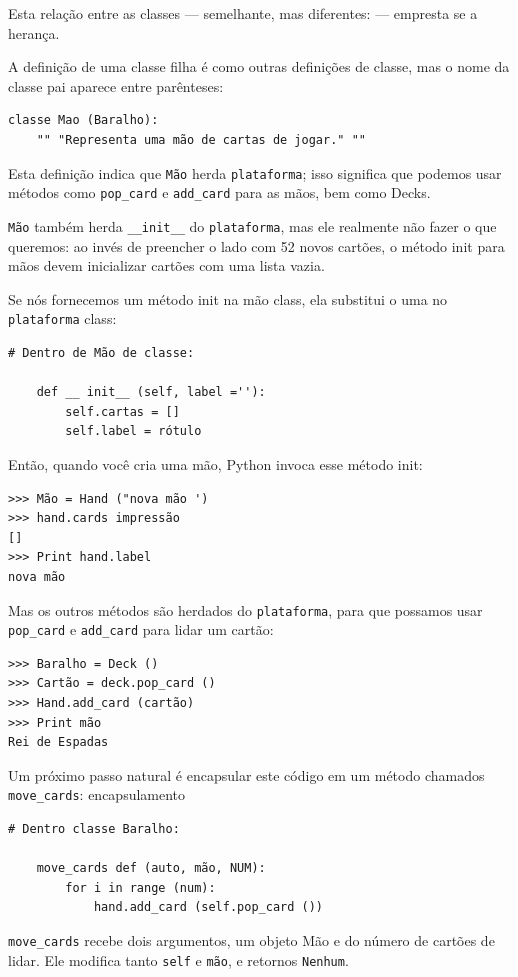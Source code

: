 \documentclass[10pt]{book}
\begin{document}
\begin{exercise}
\begin{v erbatim}
Esta relação entre as classes --- semelhante, mas diferentes: --- empresta
se a herança.  

A definição de uma classe filha é como outras definições de classe,
mas o nome da classe pai aparece entre parênteses:

\begin{verbatim}
classe Mao (Baralho):
    "" "Representa uma mão de cartas de jogar." ""
\end{verbatim}
%
Esta definição indica que {\tt Mão} herda {\tt plataforma};
isso significa que podemos usar métodos como \verb "pop_card" e \verb "add_card"
para as mãos, bem como Decks.

{\tt Mão} também herda \verb "__init__" do {\tt plataforma}, mas
ele realmente não fazer o que queremos: ao invés de preencher o lado
com 52 novos cartões, o método init para mãos devem inicializar
{cartões \tt} com uma lista vazia.

Se nós fornecemos um método init na mão {\tt} class, ela substitui o
uma no {\tt plataforma} class:

\begin{verbatim}
# Dentro de Mão de classe:

    def __ init__ (self, label =''):
        self.cartas = []
        self.label = rótulo
\end{verbatim}
%
Então, quando você cria uma mão, Python invoca esse método init:

\begin{verbatim}
>>> Mão = Hand ("nova mão ')
>>> hand.cards impressão
[]
>>> Print hand.label
nova mão
\end{verbatim}
%
Mas os outros métodos são herdados do {\tt plataforma}, para que possamos usar
\Verb "pop_card" e \verb "add_card" para lidar um cartão:

\begin{verbatim}
>>> Baralho = Deck ()
>>> Cartão = deck.pop_card ()
>>> Hand.add_card (cartão)
>>> Print mão
Rei de Espadas
\end{verbatim}
%
Um próximo passo natural é encapsular este código em um método
chamados \verb "move_cards":
\index{} encapsulamento

\begin{verbatim}
# Dentro classe Baralho:

    move_cards def (auto, mão, NUM):
        for i in range (num):
            hand.add_card (self.pop_card ())
\end{verbatim}
%
\verb "move_cards" recebe dois argumentos, um objeto Mão e do número de
cartões de lidar. Ele modifica tanto {\tt self} e {\tt mão}, e
retornos {\tt Nenhum}.


\end{v erbatim}
\end{exercise}
\end{document}
